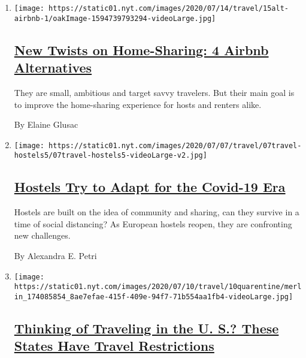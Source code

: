 \begin{enumerate}
\def\labelenumi{\arabic{enumi}.}
\item
  \texttt{[image: https://static01.nyt.com/images/2020/07/14/travel/15alt-airbnb-1/oakImage-1594739793294-videoLarge.jpg]}

  \hypertarget{new-twists-on-home-sharing-4-airbnb-alternatives}{%
  \subsection{\texorpdfstring{\href{/2020/07/15/travel/airbnb-alternatives-home-sharing.html}{New
  Twists on Home-Sharing: 4 Airbnb
  Alternatives}}{New Twists on Home-Sharing: 4 Airbnb Alternatives}}\label{new-twists-on-home-sharing-4-airbnb-alternatives}}

  They are small, ambitious and target savvy travelers. But their main
  goal is to improve the home-sharing experience for hosts and renters
  alike.

  By Elaine Glusac
\item
  \texttt{[image: https://static01.nyt.com/images/2020/07/07/travel/07travel-hostels5/07travel-hostels5-videoLarge-v2.jpg]}

  \hypertarget{hostels-try-to-adapt-for-the-covid-19-era}{%
  \subsection{\texorpdfstring{\href{/2020/07/07/travel/virus-hostels-backpacking.html}{Hostels
  Try to Adapt for the Covid-19
  Era}}{Hostels Try to Adapt for the Covid-19 Era}}\label{hostels-try-to-adapt-for-the-covid-19-era}}

  Hostels are built on the idea of community and sharing, can they
  survive in a time of social distancing? As European hostels reopen,
  they are confronting new challenges.

  By Alexandra E. Petri
\item
  \texttt{[image: https://static01.nyt.com/images/2020/07/10/travel/10quarentine/merlin\_174085854\_8ae7efae-415f-409e-94f7-71b554aa1fb4-videoLarge.jpg]}

  \hypertarget{thinking-of-traveling-in-the-u-s-these-states-have-travel-restrictions}{%
  \subsection{\texorpdfstring{\href{/2020/07/10/travel/state-travel-restrictions.html}{Thinking
  of Traveling in the U. S.? These States Have Travel
  Restrictions}}{Thinking of Traveling in the U. S.? These States Have Travel Restrictions}}\label{thinking-of-traveling-in-the-u-s-these-states-have-travel-restrictions}}


\end{enumerate}
